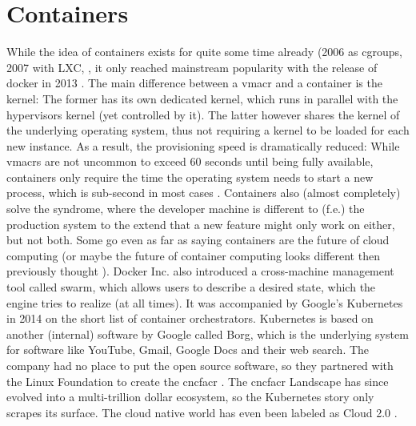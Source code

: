 

\section{Containers}
While the idea of containers exists for quite some time already (2006 as cgroups, 2007 with LXC, \cite{cgroups} \cite{lxc}, it only reached mainstream popularity with the release of docker in 2013 \cite{docker_initial_release}. The main difference between a \gls{vmacr} and a container is the kernel: The former has its own dedicated kernel, which runs in parallel with the hypervisors kernel (yet controlled by it). The latter however shares the kernel of the underlying operating system, thus not requiring a kernel to be loaded for each new instance. As a result, the provisioning speed is dramatically reduced: While \gls{vmacr}s are not uncommon to exceed 60 seconds until being fully available, containers only require the time the operating system needs to start a new process, which is sub-second in most cases \cite{vps_provisioning_times}.
\newline
Containers also (almost completely) solve the  syndrome, where the developer machine is different to (f.e.) the production system to the extend that a new feature might only work on either, but not both.
\newline
Some go even as far as saying containers are the future of cloud computing \cite{containers_future_cloud_computing} \cite{devopsonline_serverless_future} \cite{alibabacloud_serverless_future} \cite{ttpsc_serverless_future} (or maybe the future of container computing looks different then previously thought \cite{azure_modular_datacenter} \cite{google_patent_container}).
\newline
Docker Inc. also introduced a cross-machine management tool called swarm, which allows users to describe a desired state, which the engine tries to realize (at all times). It was accompanied by Google's Kubernetes in 2014 on the short list of container orchestrators. Kubernetes is based on another (internal) software by Google called Borg, which is the underlying system for software like YouTube, Gmail, Google Docs and their web search. The company had no place to put the open source software, so they partnered with the Linux Foundation to create the \gls{cncfacr} \cite{cncf_guide_landscape}. The \gls{cncfacr} Landscape has since evolved into a multi-trillion dollar ecosystem, so the Kubernetes story only scrapes its surface. The cloud native world has even been labeled as Cloud 2.0 \cite{alibabacloud_serverless_future}.

